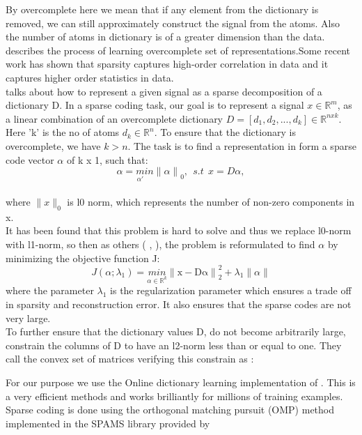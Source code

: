 By overcomplete here we mean that if any element from the dictionary is removed, we can still approximately construct the signal from the atoms. Also the number of atoms in dictionary is of a greater dimension than the data. \citet{lewicki2000learning} describes the process of learning overcomplete set of representations.Some recent work \citep{mairal2009supervised} has shown that sparsity captures high-order correlation in data and it captures higher order statistics in data.\\

\citet{huang2006sparse} talks about how to represent a given signal as a sparse decomposition of a dictionary D. In a sparse coding task, our goal is to represent a signal $x \in \mathbb{R}^m$, as a linear combination of an overcomplete dictionary $D =[d_1,d_2,...,d_k] \in \mathbb{R}^{n x k}$. Here 'k' is the no of atoms $d_k \in \mathbb{R}^n$. To ensure that the dictionary is overcomplete, we have $k > n$. The task is to find a representation in form a sparse code vector $\alpha$ of k x 1, such that:
\begin{equation}\label{eq: sparse coding}
\alpha = \underset{\alpha '}min {\lVert\alpha \rVert}_0 ,\ \ s.t \ \ x = D \alpha , 
\end{equation}
\\
where $\lVert x \rVert_0$ is l0 norm, which represents the number of non-zero components in x.\\

It has been found that this problem is hard to solve and thus we replace l0-norm with l1-norm, so then as others (\citet{lee2006efficient} , \citet{donoho2006compressed}), the problem is reformulated to find $\alpha$ by minimizing the objective function J:
\begin{equation}
J(\alpha; \lambda_1) = \underset{\alpha \in \mathbb{R}^k}{min} {\lVert \mathrm{x-D\alpha} \rVert}^2_2 + \lambda_1 \lVert \alpha \rVert
\end{equation}
where the parameter $\lambda_1$ is the regularization parameter which ensures a trade off in sparsity and reconstruction error. It also ensures that the sparse codes are not very large.\\

To further ensure that the dictionary values D, do not become arbitrarily large,\citep{mairal2009online} constrain the columns of D to have an l2-norm less than or equal to one. They call the convex set of matrices verifying this constrain as :

For our purpose we use the Online dictionary learning implementation of \citep{mairal2009online}. This is a very efficient methods and works brilliantly for millions of training examples.
Sparse coding is done using the orthogonal matching pursuit (OMP) method  \cite{pati1993orthogonal,tropp2007signal} implemented in the SPAMS library provided by \citet{mairal2010online}


